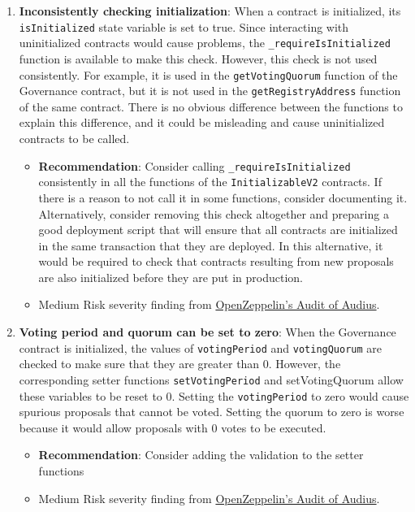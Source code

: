 \begin{enumerate}
\item\textbf{Inconsistently checking initialization}: When a contract is initialized, its \verb|isInitialized| state variable is set to true. Since interacting with uninitialized contracts would cause problems, the \verb|_requireIsInitialized| function is available to make this check. However, this check is not used consistently. For example, it is used in the \verb|getVotingQuorum| function of the Governance contract, but it is not used in the \verb|getRegistryAddress| function of the same contract. There is no obvious difference between the functions to explain this difference, and it could be misleading and cause uninitialized contracts to be called.
	\begin{itemize}
	\item\textbf{Recommendation}: Consider calling \verb|_requireIsInitialized| consistently in all the functions of the \verb|InitializableV2| contracts. If there is a reason to not call it in some functions, consider documenting it. Alternatively, consider removing this check altogether and preparing a good deployment script that will ensure that all contracts are initialized in the same transaction that they are deployed. In this alternative, it would be required to check that contracts resulting from new proposals are also initialized before they are put in production.
	\item Medium Risk severity finding from \href{https://blog.openzeppelin.com/audius-contracts-audit/#medium}{OpenZeppelin’s Audit of Audius}.
	\end{itemize}

\item\textbf{Voting period and quorum can be set to zero}: When the Governance contract is initialized, the values of \verb|votingPeriod| and \verb|votingQuorum| are checked to make sure that they are greater than 0. However, the corresponding setter functions \verb|setVotingPeriod| and setVotingQuorum allow these variables to be reset to 0. Setting the \verb|votingPeriod| to zero would cause spurious proposals that cannot be voted. Setting the quorum to zero is worse because it would allow proposals with 0 votes to be executed.
	\begin{itemize}
	\item\textbf{Recommendation}: Consider adding the validation to the setter functions
	\item Medium Risk severity finding from \href{https://blog.openzeppelin.com/audius-contracts-audit/#medium}{OpenZeppelin’s Audit of Audius}.
	\end{itemize}


\end{enumerate}
